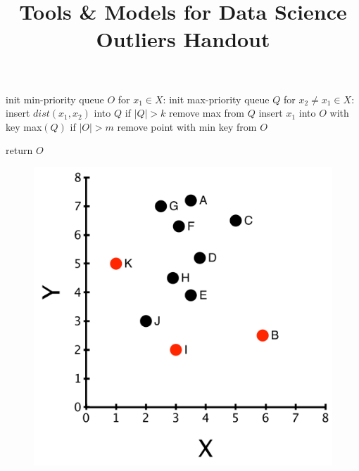 \documentclass{article}
\title{Tools \& Models for Data Science \\ Outliers Handout}
\date{}
\begin{document}
\maketitle
\thispagestyle{fancy}

\begin{SQL}
init min-priority queue $O$
for $x_1 \in X$:
  init max-priority queue $Q$
  for $x_2 \neq x_1 \in X$:
    insert $dist(x_1, x_2)$ into $Q$
    if $|Q| > k$
      remove max from $Q$
  insert $x_1$ into $O$ with key max$(Q)$
  if $|O| > m$
    remove point with min key from $O$

return $O$ 
\end{SQL}

\begin{figure}[H]
\begin{minipage}[T]{0.4\textwidth}
\includegraphics[width=1\textwidth]{lectOutliers/outliersPtsLabeled3Most.pdf}
\end{minipage}
\hspace{3em}
\begin{minipage}[T]{0.4\textwidth}


\end{minipage}
\end{figure}
\end{document}
